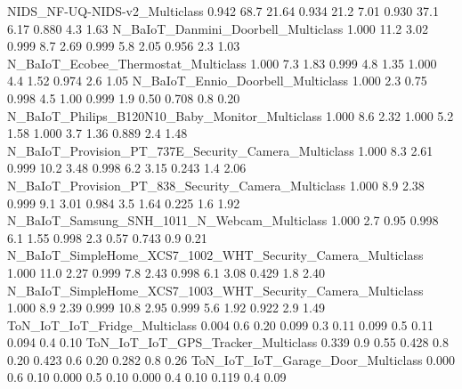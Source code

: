 NIDS_NF-UQ-NIDS-v2_Multiclass                                         0.942      68.7     21.64      0.934         21.2         7.01      0.930         37.1         6.17       0.880           4.3          1.63
N_BaIoT_Danmini_Doorbell_Multiclass                                   1.000      11.2      3.02      0.999          8.7         2.69      0.999          5.8         2.05       0.956           2.3          1.03
N_BaIoT_Ecobee_Thermostat_Multiclass                                  1.000       7.3      1.83      0.999          4.8         1.35      1.000          4.4         1.52       0.974           2.6          1.05
N_BaIoT_Ennio_Doorbell_Multiclass                                     1.000       2.3      0.75      0.998          4.5         1.00      0.999          1.9         0.50       0.708           0.8          0.20
N_BaIoT_Philips_B120N10_Baby_Monitor_Multiclass                       1.000       8.6      2.32      1.000          5.2         1.58      1.000          3.7         1.36       0.889           2.4          1.48
N_BaIoT_Provision_PT_737E_Security_Camera_Multiclass                  1.000       8.3      2.61      0.999         10.2         3.48      0.998          6.2         3.15       0.243           1.4          2.06
N_BaIoT_Provision_PT_838_Security_Camera_Multiclass                   1.000       8.9      2.38      0.999          9.1         3.01      0.984          3.5         1.64       0.225           1.6          1.92
N_BaIoT_Samsung_SNH_1011_N_Webcam_Multiclass                          1.000       2.7      0.95      0.998          6.1         1.55      0.998          2.3         0.57       0.743           0.9          0.21
N_BaIoT_SimpleHome_XCS7_1002_WHT_Security_Camera_Multiclass           1.000      11.0      2.27      0.999          7.8         2.43      0.998          6.1         3.08       0.429           1.8          2.40
N_BaIoT_SimpleHome_XCS7_1003_WHT_Security_Camera_Multiclass           1.000       8.9      2.39      0.999         10.8         2.95      0.999          5.6         1.92       0.922           2.9          1.49
ToN_IoT_IoT_Fridge_Multiclass                                         0.004       0.6      0.20      0.099          0.3         0.11      0.099          0.5         0.11       0.094           0.4          0.10
ToN_IoT_IoT_GPS_Tracker_Multiclass                                    0.339       0.9      0.55      0.428          0.8         0.20      0.423          0.6         0.20       0.282           0.8          0.26
ToN_IoT_IoT_Garage_Door_Multiclass                                    0.000       0.6      0.10      0.000          0.5         0.10      0.000          0.4         0.10       0.119           0.4          0.09
